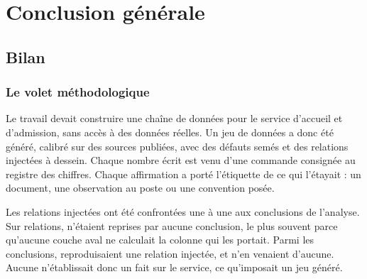 
\chapter*{Conclusion générale}

\section*{Bilan}

\subsection*{Le volet méthodologique}

Le travail devait construire une chaîne de données pour le service d'accueil et d'admission, sans
accès à des données réelles. Un jeu de données a donc été généré, calibré sur des sources publiées,
avec des défauts semés et des relations injectées à dessein. Chaque nombre écrit est venu d'une
commande consignée au registre des chiffres. Chaque affirmation a porté l'étiquette de ce qui
l'étayait : un document, une observation au poste ou une convention posée.

Les relations injectées ont été confrontées une à une aux conclusions de l'analyse. Sur
 relations,  n'étaient reprises par
aucune conclusion, le plus souvent parce qu'aucune couche aval ne calculait la colonne qui les
portait. Parmi les conclusions,  reproduisaient une relation
injectée, et  n'en venaient d'aucune. Aucune n'établissait donc un fait sur le
service, ce qu'imposait un jeu généré.

